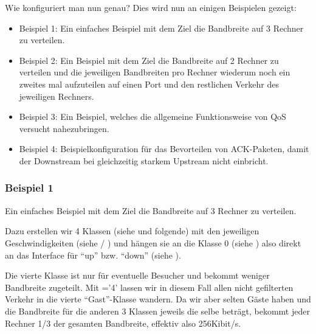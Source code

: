 


   Wie konfiguriert man  nun genau? Dies wird nun an einigen
   Beispielen gezeigt:
   \begin{itemize}

   \item Beispiel 1: Ein einfaches Beispiel mit dem Ziel die
     Bandbreite auf 3 Rechner zu verteilen.

   \item Beispiel 2: Ein Beispiel mit dem Ziel die Bandbreite auf 2
     Rechner zu verteilen und die jeweiligen Bandbreiten pro Rechner
     wiederum noch ein zweites mal aufzuteilen auf einen Port und den
     restlichen Verkehr des jeweiligen Rechners.

   \item Beispiel 3: Ein Beispiel, welches die allgemeine
     Funktionsweise von QoS versucht nahezubringen.

   \item Beispiel 4: Beispielkonfiguration für das Bevorteilen von
     ACK-Paketen, damit der Downstream bei gleichzeitig starkem
     Upstream nicht einbricht.
   \end{itemize}



\subsubsection{Beispiel 1}



   Ein einfaches Beispiel mit dem Ziel die Bandbreite auf 3 Rechner zu
   verteilen.

   Dazu erstellen wir 4 Klassen (siehe  und folgende)
   mit den jeweiligen Geschwindigkeiten (siehe
    / ) und
   hängen sie an die Klasse 0 (siehe ) also
   direkt an das Interface für ``up'' bzw. ``down'' (siehe
   ).

   Die vierte Klasse ist nur für eventuelle Besucher und bekommt weniger
   Bandbreite zugeteilt. Mit ='4' lassen wir in
   diesem Fall allen nicht gefilterten Verkehr in die vierte
   ``Gast''-Klasse wandern. Da wir aber selten Gäste haben und die
   Bandbreite für die anderen 3 Klassen jeweils die selbe beträgt,
   bekommt jeder Rechner 1/3 der gesamten Bandbreite, effektiv also
   256Kibit/s.

